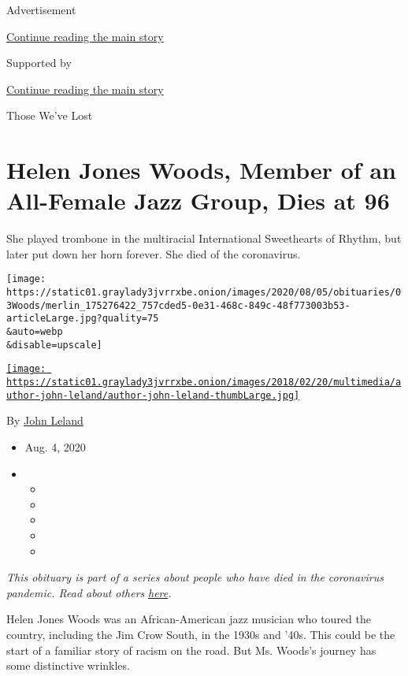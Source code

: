 Advertisement

\protect\hyperlink{after-top}{Continue reading the main story}

Supported by

\protect\hyperlink{after-sponsor}{Continue reading the main story}

Those We've Lost

\hypertarget{helen-jones-woods-member-of-an-all-female-jazz-group-dies-at-96}{%
\section{Helen Jones Woods, Member of an All-Female Jazz Group, Dies at
96}\label{helen-jones-woods-member-of-an-all-female-jazz-group-dies-at-96}}

She played trombone in the multiracial International Sweethearts of
Rhythm, but later put down her horn forever. She died of the
coronavirus.

\texttt{[image: https://static01.graylady3jvrrxbe.onion/images/2020/08/05/obituaries/03Woods/merlin\_175276422\_757cded5-0e31-468c-849c-48f773003b53-articleLarge.jpg?quality=75\\\&auto=webp\\\&disable=upscale]}

\href{https://www.nytimes3xbfgragh.onion/by/john-leland}{\texttt{[image: https://static01.graylady3jvrrxbe.onion/images/2018/02/20/multimedia/author-john-leland/author-john-leland-thumbLarge.jpg]}}

By \href{https://www.nytimes3xbfgragh.onion/by/john-leland}{John Leland}

\begin{itemize}
\item
  Aug. 4, 2020
\item
  \begin{itemize}
  \item
  \item
  \item
  \item
  \item
  \end{itemize}
\end{itemize}

\emph{This obituary is part of a series about people who have died in
the coronavirus pandemic. Read about others}
\href{https://www.nytimes3xbfgragh.onion/interactive/2020/obituaries/people-died-coronavirus-obituaries.html}{\emph{here}}\emph{.}

Helen Jones Woods was an African-American jazz musician who toured the
country, including the Jim Crow South, in the 1930s and '40s. This could
be the start of a familiar story of racism on the road. But Ms. Woods's
journey has some distinctive wrinkles.

